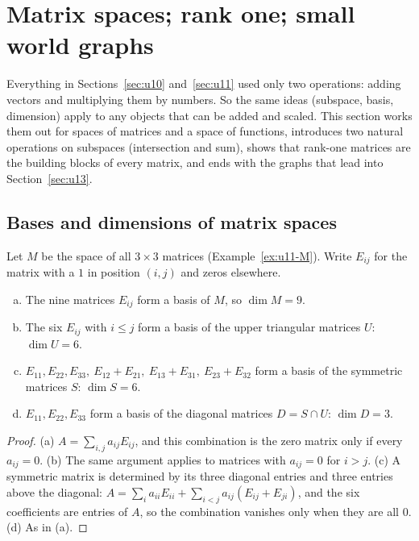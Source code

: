 \section{Matrix spaces; rank one; small world graphs}\label{sec:u12}

Everything in Sections~\ref{sec:u10} and~\ref{sec:u11} used only two operations: adding vectors and
multiplying them by numbers. So the same ideas (subspace, basis, dimension) apply to any objects
that can be added and scaled. This section works them out for spaces of matrices and a space of
functions, introduces two natural operations on subspaces (intersection and sum), shows that
rank-one matrices are the building blocks of every matrix, and ends with the graphs that lead into
Section~\ref{sec:u13}.

\subsection{Bases and dimensions of matrix spaces}

Let $M$ be the space of all $3\times3$ matrices (Example~\ref{ex:u11-M}). Write $E_{ij}$ for the
matrix with a $1$ in position $(i,j)$ and zeros elsewhere.

\begin{proposition}\label{prop:u12-dims}
\begin{enumerate}[(a)]
\item The nine matrices $E_{ij}$ form a basis of $M$, so $\dim M=9$.
\item The six $E_{ij}$ with $i\le j$ form a basis of the upper triangular matrices $U$: $\dim U=6$.
\item $E_{11},E_{22},E_{33},\ E_{12}+E_{21},\ E_{13}+E_{31},\ E_{23}+E_{32}$ form a basis of the
symmetric matrices $S$: $\dim S=6$.
\item $E_{11},E_{22},E_{33}$ form a basis of the diagonal matrices $D=S\cap U$: $\dim D=3$.
\end{enumerate}
\end{proposition}
\begin{proof}
(a) $A=\sum_{i,j}a_{ij}E_{ij}$, and this combination is the zero matrix only if every $a_{ij}=0$.
(b) The same argument applies to matrices with $a_{ij}=0$ for $i>j$. (c) A symmetric matrix is
determined by its three diagonal entries and three entries above the diagonal:
$A=\sum_i a_{ii}E_{ii}+\sum_{i<j}a_{ij}(E_{ij}+E_{ji})$, and the six coefficients are entries of
$A$, so the combination vanishes only when they are all $0$. (d) As in (a).
\end{proof}

